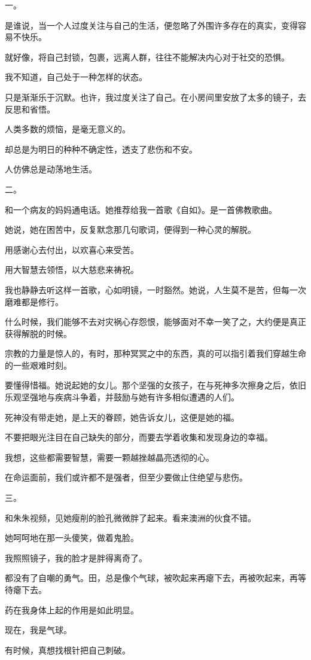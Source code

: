 \documentclass[12pt,a4paper]{article}
\newcommand{\subpart}[1]{
	\begingroup \par
	\vspace{1ex} \centering #1
	\par \endgroup \nopagebreak[4]
}
\begin{document}
	\endwriting



		\subpart{一。}
		是谁说，当一个人过度关注与自己的生活，便忽略了外围许多存在的真实，变得容易不快乐。\par
		就好像，将自己封锁，包裹，远离人群，往往不能解决内心对于社交的恐惧。\par
		我不知道，自己处于一种怎样的状态。\par
		只是渐渐乐于沉默。也许，我过度关注了自己。在小房间里安放了太多的镜子，去反思和省悟。\par
		人类多数的烦恼，是毫无意义的。\par
		却总是为明日的种种不确定性，透支了悲伤和不安。\par
		人仿佛总是动荡地生活。


		\subpart{二。}
		和一个病友的妈妈通电话。她推荐给我一首歌《自如》。是一首佛教歌曲。\par
		她说，她在困苦中，反复默念那几句歌词，便得到一种心灵的解脱。

		用感谢心去付出，以欢喜心来受苦。\par
		用大智慧去领悟，以大慈悲来祷祝。

		我也静静去听这样一首歌，心如明镜，一时豁然。她说，人生莫不是苦，但每一次磨难都是修行。\par
		什么时候，我们能够不去对灾祸心存怨恨，能够面对不幸一笑了之，大约便是真正获得解脱的时候。\par
		宗教的力量是惊人的，有时，那种冥冥之中的东西，真的可以指引着我们穿越生命的一些艰难时刻。\par
		要懂得惜福。她说起她的女儿。那个坚强的女孩子，在与死神多次擦身之后，依旧乐观坚强地与疾病斗争着，并鼓励与她有许多相似遭遇的人们。\par
		死神没有带走她，是上天的眷顾，她告诉女儿，这便是她的福。\par
		不要把眼光注目在自己缺失的部分，而要去学着收集和发现身边的幸福。\par
		我想，这些都需要智慧，需要一颗越挫越晶亮透彻的心。\par
		在命运面前，我们或许都不是强者，但至少要做止住绝望与悲伤。

		\subpart{三。}
		和朱朱视频，见她瘦削的脸孔微微胖了起来。看来澳洲的伙食不错。\par
		她呵呵地在那一头傻笑，做着鬼脸。\par
		我照照镜子，我的脸才是胖得离奇了。\par
		都没有了自嘲的勇气。田，总是像个气球，被吹起来再瘪下去，再被吹起来，再等待瘪下去。\par
		药在我身体上起的作用是如此明显。\par
		现在，我是气球。\par
		有时候，真想找根针把自己刺破。
\end{document}

